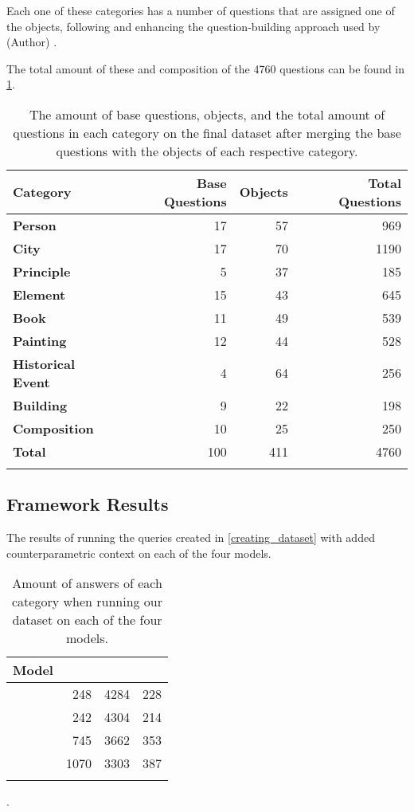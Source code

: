 Each one of these categories has a number of questions that are assigned one of the objects, following and enhancing the question-building approach used by (Author) \cite{factual_recall}.

The total amount of these and composition of the 4760 questions can be found in \cref{category_amounts}.

\begin{table}[ht]
	\centering
	\footnotesize
	\begin{tabular}{>{\bfseries}l r r r}
		\toprule
			\bfseries Category & \bfseries Base Questions & \bfseries Objects & \bfseries Total Questions \\
		\midrule
			Person           &  17 &  57 &  969 \\
			City             &  17 &  70 & 1190 \\
			Principle        &   5 &  37 &  185 \\
			Element          &  15 &  43 &  645 \\
			Book             &  11 &  49 &  539 \\
			Painting         &  12 &  44 &  528 \\
			Historical Event &   4 &  64 &  256 \\
			Building         &   9 &  22 &  198 \\
			Composition      &  10 &  25 &  250 \\
		\midrule
			Total            & 100 & 411 & 4760 \\
		\bottomrule \addlinespace[4pt]
	\end{tabular}
	\caption{The amount of base questions, objects, and the total amount of questions in each category on the final dataset after merging the base questions with the objects of each respective category.}
	\label{category_amounts}
\end{table}

\subsection{Framework Results}
\label{framework_results}

The results of running the queries created in \cref{creating_dataset} with added counterparametric context on each of the four models.

\begin{table}[htbp]
	\centering
	\footnotesize
	\begin{tabular}{l r r r}
		\toprule
			\bfseries Model & \Parametric{} & \Contextual{} & \Other{} \\
		\midrule
			\smallflan{}  & 248 & 4284 & 228 \\
			\bigflan{} & 242 & 4304 & 214 \\
		\midrule
			\llamaparbox{} & 745 & 3662 & 353 \\[10pt]
			\bigllamaparbox{} & 1070 & 3303 & 387 \\[5pt]
		\bottomrule \addlinespace[4pt]
	\end{tabular}
	\caption{Amount of answers of each category when running our dataset on each of the four models.}
	\label{total_table}.
\end{table}

